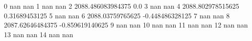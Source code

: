 0 nan nan
1 nan nan
2 2088.486083984375 0.0
3 nan nan
4 2088.802978515625 0.31689453125
5 nan nan
6 2088.03759765625 -0.448486328125
7 nan nan
8 2087.62646484375 -0.859619140625
9 nan nan
10 nan nan
11 nan nan
12 nan nan
13 nan nan
14 nan nan
